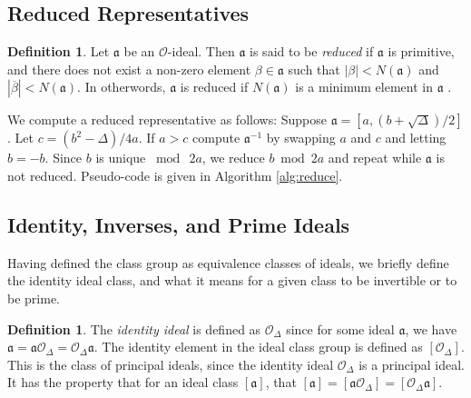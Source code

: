 \documentclass{ucalgthes1}
\theoremstyle{plain}
\theoremstyle{definition}
\newtheorem{defn}[thm]{Definition}
\newcommand{\OO}{\mathcal{O}}
\begin{document}
\subsection{Reduced Representatives}
\label{subsec:reduction}
\begin{defn}
Let $\mathfrak{a}$ be an $\OO$-ideal. Then $\mathfrak{a}$ is said to be \emph{reduced} if $\mathfrak{a}$ is primitive, and there does not exist a non-zero element $\beta \in \mathfrak{a}$ such that $|\beta| < N(\mathfrak{a})$ and $|\overline{\beta}| < N(\mathfrak{a})$.  In otherwords, $\mathfrak a$ is reduced if $N(\mathfrak{a})$ is a minimum element in $\mathfrak{a}$ \cite[p.~98]{Jac09}.
\end{defn}

We compute a reduced representative as follows:  Suppose $\mathfrak a = [a, (b + \sqrt\Delta)/2]$.  Let $c = (b^2 - \Delta)/4a$.  If $a > c$ compute ${\mathfrak a}^{-1}$ by swapping $a$ and $c$ and letting $b = -b$.  Since $b$ is unique $\bmod{~2a}$, we reduce $b \bmod{2a}$ and repeat while $\mathfrak a$ is not reduced.  Pseudo-code is given in Algorithm \ref{alg:reduce}.



\subsection{Identity, Inverses, and Prime Ideals}\label{subsec:iipIdeals}

Having defined the class group as equivalence classes of ideals, we briefly define the identity ideal class, and what it means for a given class to be invertible or to be prime.

\begin{defn}
The \emph{identity ideal} is defined as $\OO_\Delta$ since for some ideal $\mathfrak a$, we have $\mathfrak a = \mathfrak a \OO_\Delta = \OO_\Delta \mathfrak a$.  The identity element in the ideal class group is defined as $[\OO_\Delta]$.  This is the class of principal ideals, since the identity ideal $\OO_\Delta$ is a principal ideal.  It has the property that for an ideal class $[\mathfrak a]$, that $[\mathfrak a] = [\mathfrak a \OO_\Delta] = [\OO_\Delta \mathfrak a]$. 
\end{defn}
\end{document}
